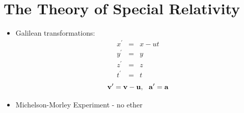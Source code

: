 \documentclass[12pt]{article}
\begin{document}
\section{The Theory of Special Relativity}
\begin{itemize}
\item Galilean transformations:
\begin{eqnarray}
x^\prime &= &x - ut \\
y^\prime &= &y \\
z^\prime &= &z \\
t^\prime &= &t
\end{eqnarray}
\begin{equation}
\bf{v}^\prime = \bf{v} - \bf{u},~~\bf{a}^\prime = \bf{a}
\end{equation}

\item Michelson-Morley Experiment - no ether


\end{itemize}
\end{document}
